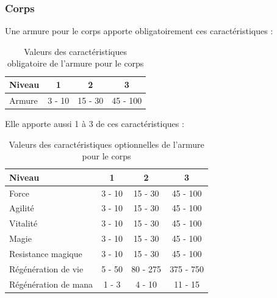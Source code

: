 \documentclass[11pt, a4paper, oneside]{report}
\begin{document}
\subsubsection{Corps}
Une armure pour le corps apporte obligatoirement ces caractéristiques :
\begin{table}[H]
\begin{center}
\begin{tabular}{| l | c | c | c |}
  \hline      
  Niveau 				& 1 & 2 & 3\\ \hline \hline
  Armure 				& 3 - 10 & 15 - 30 & 45 - 100\\ \hline
\end{tabular}
\caption{Valeurs des caractéristiques obligatoire de l'armure pour le corps}
\end{center}
\end{table}
Elle apporte aussi 1 à 3 de ces caractéristiques :
\begin{table}[H]
\begin{center}
\begin{tabular}{| l | c | c | c |}
  \hline      
  Niveau 				& 1 & 2 & 3\\ \hline \hline                 
  Force 				& 3 - 10 & 15 - 30 & 45 - 100\\ \hline
  Agilité 				& 3 - 10 & 15 - 30 & 45 - 100\\ \hline
  Vitalité 				& 3 - 10 & 15 - 30 & 45 - 100\\ \hline
  Magie 				& 3 - 10 & 15 - 30 & 45 - 100\\ \hline
  Resistance magique 	& 3 - 10 & 15 - 30 & 45 - 100\\ \hline
  Régénération de vie 	& 5 - 50  & 80 - 275 & 375 - 750\\ \hline
  Régénération de mana 	& 1 - 3  & 4 - 10 & 11 - 15\\ \hline
\end{tabular}
\caption{Valeurs des caractéristiques optionnelles de l'armure pour le corps}
\end{center}
\end{table}
\end{document}
